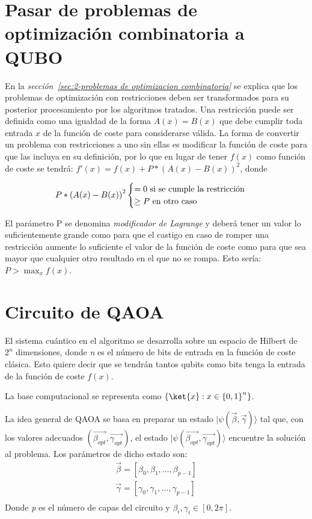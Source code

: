 \section{Pasar de problemas de optimización combinatoria a QUBO\label{sec:3-problemas de optimizacion combinatoria}}

En la \textit{sección~\ref{sec:2-problemas de optimizacion combinatoria}} se explica que los problemas de optimización con restricciones deben ser transformados para su posterior procesamiento por los algoritmos tratados.
Una restricción puede ser definida como una igualdad de la forma $A(x) = B(x)$ que debe cumplir toda entrada $x$ de la función de coste para considerarse válida.
La forma de convertir un problema con restricciones a uno sin ellas es modificar la función de coste para que las incluya en su definición, por lo que en lugar de tener $f(x)$ como función de coste se tendrá:
$f'(x) = f(x) + P*{(A(x)-B(x))}^2$, donde

\begin{align*}
  P*{(A(x) - B(x))}^2 \begin{cases}
    = 0 \textnormal{ si se cumple la restricción } \\
    \ge P \textnormal{ en otro caso }
  \end{cases}
\end{align*}

El parámetro P se denomina \textit{modificador de Lagrange} y deberá tener un valor lo suficientemente grande como para que el castigo en caso de romper una restricción aumente lo suficiente el valor de la función de coste como para que sea mayor que cualquier otro resultado en el que no se rompa. Esto sería: $P > \max_x{f(x)}$.

\section{Circuito de QAOA\label{sec:3-circuito de qaoa}}
El sistema cuántico en el algoritmo se desarrolla sobre un espacio de Hilbert de $2^n$ dimensiones, donde \textit{n} es el número de bits de entrada en la función de coste clásica. Esto quiere decir que se tendrán tantos qubits como bits tenga la entrada de la función de coste $f(x)$.

La base computacional se representa como $\{\ket{x} : x \in {\{0, 1\}}^n\}$.

La idea general de QAOA se basa en preparar un estado \(\lvert \psi(\vec{\beta}, \vec{\gamma})\rangle\) tal que, con los valores adecuados \( (\vec{\beta_{opt}}, \vec{\gamma_{opt}}) \), el estado \(\lvert\psi(\vec{\beta_{opt}}, \vec{\gamma_{opt}})\rangle\) encuentre la solución al problema. Los parámetros de dicho estado son:
\begin{align*}
  \vec{\beta} = [\beta_0, \beta_1, \ldots , \beta_{p-1}] \\
  \vec{\gamma} = [\gamma_0, \gamma_1, \ldots , \gamma_{p-1}] \\
\end{align*}
Donde \textit{p} es el número de capas del circuito y $\beta_i, \gamma_i \in{[0, 2\pi]}$.

